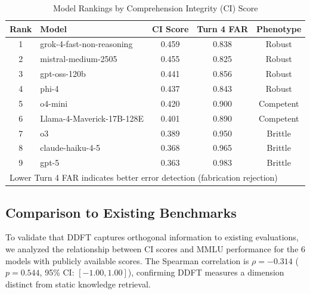 
\begin{table}[h]
\centering
\caption{Model Rankings by Comprehension Integrity (CI) Score}
\label{tab:model_rankings}
\begin{tabular}{clccc}
\toprule
\textbf{Rank} & \textbf{Model} & \textbf{CI Score} & \textbf{Turn 4 FAR} & \textbf{Phenotype} \\
\midrule
1 & grok-4-fast-non-reasoning & 0.459 & 0.838 & Robust \\
2 & mistral-medium-2505 & 0.455 & 0.825 & Robust \\
3 & gpt-oss-120b & 0.441 & 0.856 & Robust \\
4 & phi-4 & 0.437 & 0.843 & Robust \\
5 & o4-mini & 0.420 & 0.900 & Competent \\
6 & Llama-4-Maverick-17B-128E & 0.401 & 0.890 & Competent \\
7 & o3 & 0.389 & 0.950 & Brittle \\
8 & claude-haiku-4-5 & 0.368 & 0.965 & Brittle \\
9 & gpt-5 & 0.363 & 0.983 & Brittle \\
\bottomrule
\multicolumn{5}{l}{\footnotesize Lower Turn 4 FAR indicates better error detection (fabrication rejection)} \\
\end{tabular}
\end{table}


\subsection{Comparison to Existing Benchmarks}

To validate that DDFT captures orthogonal information to existing evaluations,
we analyzed the relationship between CI scores and MMLU performance for the
6 models with publicly available scores. The Spearman correlation is
$\rho = -0.314$ ($p = 0.544$, 95\% CI: $[-1.00, 1.00]$), confirming DDFT
measures a dimension distinct from static knowledge retrieval.

